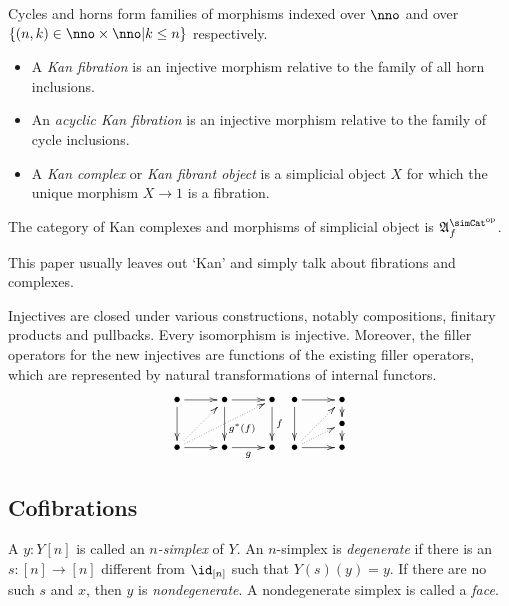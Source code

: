 \documentclass{tac}
\newcommand\hide[1]{}
\newcommand\set[1]{\left\{#1\right\}}
\newcommand\ri{^*}
\newcommand\dual{^{\mathrm{op}}}
\newcommand\s{^{\simCat\dual}}
\newcommand\of{:}
\newcommand\f{_f}
\newcommand\ambient{\mathfrak A}
\begin{document}
\begin{definition} Cycles and horns form families of morphisms indexed over $\nno$ and over $\set{(n,k)\in\nno\times\nno| k\leq n }$ respectively.
\begin{itemize}
\item A \emph{Kan fibration} is an injective morphism relative to the family of all horn inclusions.
\item An \emph{acyclic Kan fibration} is an injective morphism relative to the family of cycle inclusions.
\item A \emph{Kan complex} or \emph{Kan fibrant object} is a simplicial object $X$ for which the unique morphism $X\to 1$ is a fibration.
\end{itemize}\label{Kan}

The category of Kan complexes and morphisms of simplicial object is $\ambient\s\f$. \hide{
In the categories we are looking at, the terminal object is projective. Therefore the internal and external concepts of having a filler operator coincide.
[I am so angry]
}
\end{definition}
This paper usually leaves out `Kan' and simply talk about fibrations and complexes. 

\hide{ no witnesses }

\begin{remark}[Saturation] Injectives are closed under various constructions, notably compositions, finitary products and pullbacks. Every isomorphism is injective. Moreover, the filler operators for the new injectives are functions of the existing filler operators, which are represented by natural transformations of internal functors.
\[
\xy
(0,12)*+{\bullet}="a",(12,12)*+{\bullet}="b",(24,12)*+{\bullet}="c",
(0,0)*+{\bullet}="d",(12,0)*+{\bullet}="e",(24,0)*+{\bullet}="f",
\ar "a";"b" \ar "b";"c" \ar "a";"d" \ar^(.6){g\ri(f)} "b";"e" \ar^f "c";"f" \ar "d";"e" \ar_g "e";"f"
\ar@{.>} "d";"c" \ar@{.>} "d";"b"
\endxy
\xy
(0,12)*+{\bullet}="a",(12,12)*+{\bullet}="b",(12,6)*+{\bullet}="c",(0,0)*+{\bullet}="d",(12,0)*+{\bullet}="e"
\ar "a";"b" \ar "a";"d" \ar "b";"c" \ar "c";"e" \ar "d";"e" \ar@{.>} "d";"b" \ar@{.>} "d";"c"
\endxy
\]
\end{remark}


\subsection{Cofibrations}

\begin{definition} A $y\of Y[n]$ is called an \emph{$n$-simplex} of $Y$. An $n$-simplex is \emph{degenerate} if there is an $s\of [n]\to [n]$ different from $\id_{[n]}$ such that $Y(s)(y)=y$. If there are no such $s$ and $x$, then $y$ is \emph{nondegenerate}. A nondegenerate simplex is called a \emph{face}.\end{definition}
\end{document}
